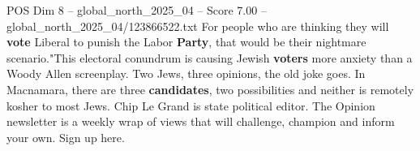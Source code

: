\begin{textsample}{POS Dim 8 – global\_north\_2025\_04 – Score 7.00 – global\_north\_2025\_04/123866522.txt}
For people who are thinking they will \textbf{vote} Liberal to punish the Labor \textbf{Party}, that would be their nightmare scenario."This electoral conundrum is causing Jewish \textbf{voters} more anxiety than a Woody Allen screenplay.
Two Jews, three opinions, the old joke goes.
In Macnamara, there are three \textbf{candidates}, two possibilities and neither is remotely kosher to most Jews.
Chip Le Grand is state political editor.
The Opinion newsletter is a weekly wrap of views that will challenge, champion and inform your own.
Sign up here.

\end{textsample}
